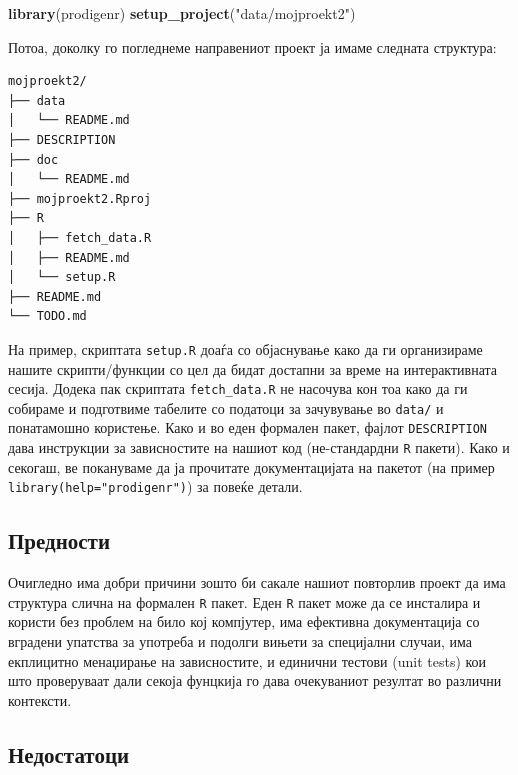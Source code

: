 \documentclass[
]{book}
\newenvironment{Shaded}{\begin{snugshade}}{\end{snugshade}}
\newcommand{\KeywordTok}[1]{\textcolor[rgb]{0.13,0.29,0.53}{\textbf{#1}}}
\newcommand{\NormalTok}[1]{#1}
\newcommand{\StringTok}[1]{\textcolor[rgb]{0.31,0.60,0.02}{#1}}
\begin{document}
\begin{Shaded}
\begin{Highlighting}[]
\KeywordTok{library}\NormalTok{(prodigenr)}
\KeywordTok{setup_project}\NormalTok{(}\StringTok{"data/mojproekt2"}\NormalTok{)}
\end{Highlighting}
\end{Shaded}

Потоа, доколку го погледнеме направениот проект ја имаме следната структура:

\begin{verbatim}
mojproekt2/
├── data
│   └── README.md
├── DESCRIPTION
├── doc
│   └── README.md
├── mojproekt2.Rproj
├── R
│   ├── fetch_data.R
│   ├── README.md
│   └── setup.R
├── README.md
└── TODO.md
\end{verbatim}

На пример, скриптата \texttt{setup.R} доаѓа со објаснување како да ги организираме нашите скрипти/функции со цел да бидат достапни за време на интерактивната сесија. Додека пак скриптата \texttt{fetch\_data.R} не насочува кон тоа како да ги собираме и подготвиме табелите со податоци за зачувување во \texttt{data/} и понатамошно користење. Како и во еден формален пакет, фајлот \texttt{DESCRIPTION} дава инструкции за зависностите на нашиот код (не-стандардни \texttt{R} пакети). Како и секогаш, ве покануваме да ја прочитате документацијата на пакетот (на пример \texttt{library(help="prodigenr")}) за повеќе детали.

\hypertarget{ux43fux440ux435ux434ux43dux43eux441ux442ux438-1}{%
\subsection{Предности}\label{ux43fux440ux435ux434ux43dux43eux441ux442ux438-1}}

Очигледно има добри причини зошто би сакале нашиот повторлив проект да има структура слична на формален \texttt{R} пакет. Еден \texttt{R} пакет може да се инсталира и користи без проблем на било кој компјутер, има ефективна документација со вградени упатства за употреба и подолги вињети за специјални случаи, има екплицитно менаџирање на зависностите, и единични тестови (unit tests) кои што проверуваат дали секоја фунцкија го дава очекуваниот резултат во различни контексти.

\hypertarget{ux43dux435ux434ux43eux441ux442ux430ux442ux43eux446ux438-1}{%
\subsection{Недостатоци}\label{ux43dux435ux434ux43eux441ux442ux430ux442ux43eux446ux438-1}}
\end{document}
